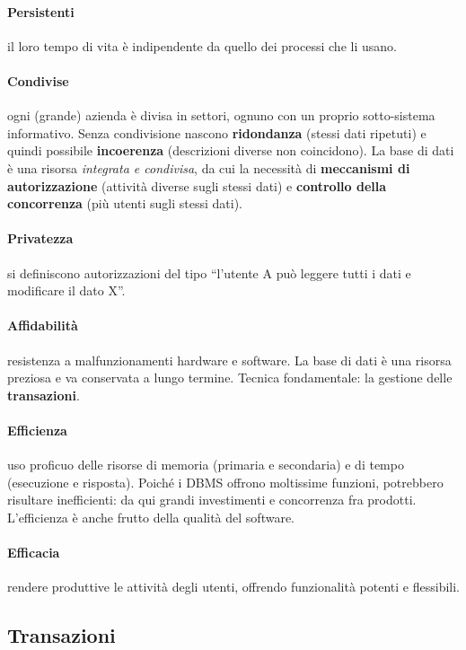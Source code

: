 \documentclass[a4paper,12pt]{article}
\begin{document}
\paragraph{Persistenti} il loro tempo di vita è indipendente da quello dei
processi che li usano.

\paragraph{Condivise} ogni (grande) azienda è divisa in settori, ognuno con un
proprio sotto-sistema informativo. Senza condivisione nascono
\textbf{ridondanza} (stessi dati ripetuti) e quindi possibile
\textbf{incoerenza} (descrizioni diverse non coincidono). La base di dati è una
risorsa \emph{integrata e condivisa}, da cui la necessità di
\textbf{meccanismi di autorizzazione} (attività diverse sugli stessi dati) e
\textbf{controllo della concorrenza} (più utenti sugli stessi dati).

\paragraph{Privatezza} si definiscono autorizzazioni del tipo ``l'utente A può
leggere tutti i dati e modificare il dato X''.

\paragraph{Affidabilità} resistenza a malfunzionamenti hardware e software. La
base di dati è una risorsa preziosa e va conservata a lungo termine. Tecnica
fondamentale: la gestione delle \textbf{transazioni}.

\paragraph{Efficienza} uso proficuo delle risorse di memoria (primaria e
secondaria) e di tempo (esecuzione e risposta). Poiché i DBMS offrono moltissime
funzioni, potrebbero risultare inefficienti: da qui grandi investimenti e
concorrenza fra prodotti. L'efficienza è anche frutto della qualità del
software.

\paragraph{Efficacia} rendere produttive le attività degli utenti, offrendo
funzionalità potenti e flessibili.

\subsection{Transazioni}
\end{document}
